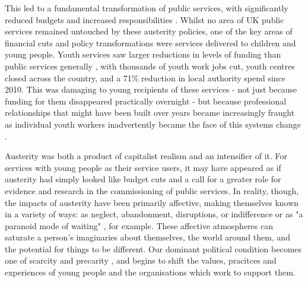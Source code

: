 This led to a fundamental transformation of public services, with significantly reduced budgets and  increased responsibilities \citep{clifford_charitable_2017, jones_uneven_2016}. Whilst no area of UK public services remained untouched by these austerity policies, one of the key areas of financial cuts and policy transformations were services delivered to children and young people. Youth services saw larger reductions in levels of funding than public services generally \citep{youdell_assembling_2015}, with thousands of youth work jobs cut, youth centres closed across the country, and a 71\% reduction in local authority spend since 2010. %
This was damaging to young recipients of these services - not just because funding for them disappeared practically overnight - but because professional relationships that might have been built over years became increasingly fraught as individual youth workers inadvertently became the face of this systems change \citep{clayton_distancing_2016}. 

Austerity was both a product of capitalist realism and an intensifier of it. For services with young people as their service users, it may have appeared as if austerity had simply looked like budget cuts and a call for a greater role for evidence and research in the commissioning of public services. In reality, though, the impacts of austerity have been primarily affective, making themselves known in a variety of ways: as neglect, abandonment, disruptions, or indifference  \citep{raynor_dramatising_2017} or as "a paranoid mode of waiting" \citep{hitchen_affective_2019}, for example. These affective atmospheres can saturate a person's imaginaries about themselves, the world around them, and the potential for things to be different. Our dominant political condition becomes one of scarcity and precarity \citep{berlant_cruel_2011}, and begins to shift the values, pracitces and experiences of young people and the organisations which work to support them. 

